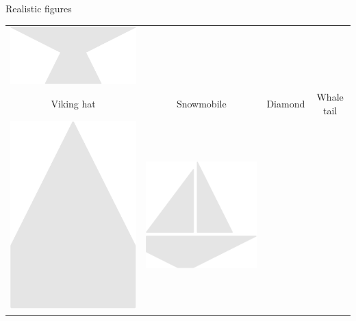 \documentclass[14pt]{beamer}
\begin{document}
\begin{frame}{Realistic figures}
\begin{center}
{\begin{tabular}{cccc}
                \includegraphics[scale=0.25]{figures/figure026d.pdf}\\
                Viking hat & Snowmobile & Diamond & Whale tail\\[3ex]
                \includegraphics[scale=0.25]{figures/figure026e.pdf} &
                \includegraphics[scale=0.25]{figures/figure026c.pdf} &

\end{tabular}}
\end{center}
\end{frame}
\end{document}
